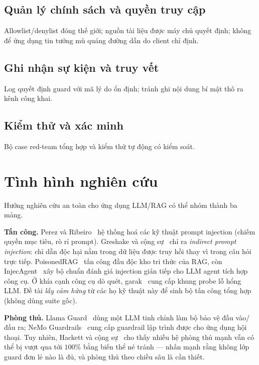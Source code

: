 \subsection{Quản lý chính sách và quyền truy cập}
Allowlist/denylist đóng thế giới; nguồn tài liệu được máy chủ quyết định; không để ứng dụng tin tưởng mù quáng đường dẫn do client chỉ định.

\subsection{Ghi nhận sự kiện và truy vết}
Log quyết định guard với mã lý do ổn định; tránh ghi nội dung bí mật thô ra kênh công khai.

\subsection{Kiểm thử và xác minh}
Bộ case red-team tổng hợp và kiểm thử tự động có kiểm soát.

\section{Tình hình nghiên cứu}

Hướng nghiên cứu an toàn cho ứng dụng LLM/RAG có thể nhóm thành ba mảng.

\textbf{Tấn công.} Perez và Ribeiro~\cite{perez2022ignore} hệ thống hoá các kỹ
thuật prompt injection (chiếm quyền mục tiêu, rò rỉ prompt). Greshake và cộng
sự~\cite{greshake2023indirect} chỉ ra \emph{indirect prompt injection}: chỉ dẫn
độc hại nằm trong dữ liệu được truy hồi thay vì trong câu hỏi trực tiếp.
PoisonedRAG~\cite{zou2024poisonedrag} tấn công đầu độc kho tri thức của RAG, còn
InjecAgent~\cite{zhan2024injecagent} xây bộ chuẩn đánh giá injection gián tiếp cho
LLM agent tích hợp công cụ. Ở khía cạnh công cụ dò quét, garak~\cite{derczynski2024garak}
cung cấp khung probe lỗ hổng LLM. Đề tài \emph{lấy cảm hứng} từ các họ kỹ thuật
này để sinh bộ tấn công tổng hợp (không dùng suite gốc).

\textbf{Phòng thủ.} Llama Guard~\cite{inan2023llamaguard} dùng một LLM tinh chỉnh
làm bộ bảo vệ đầu vào/đầu ra; NeMo Guardrails~\cite{rebedea2023nemo} cung cấp
guardrail lập trình được cho ứng dụng hội thoại. Tuy nhiên, Hackett và cộng
sự~\cite{hackett2025bypass} cho thấy nhiều hệ phòng thủ mạnh vẫn có thể bị vượt
qua tới $100\%$ bằng biến thể né tránh --- nhấn mạnh rằng không lớp guard đơn lẻ
nào là đủ, và phòng thủ theo chiều sâu là cần thiết.

